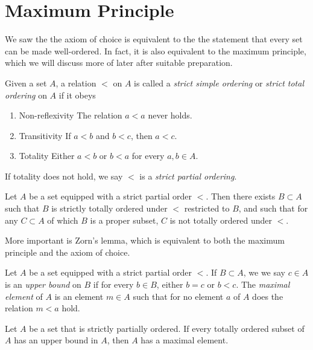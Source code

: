 \section{Maximum Principle}
We saw the the axiom of choice is equivalent to the the statement that
every set can be made well-ordered. In fact, it is also equivalent to the
maximum principle, which we will discuss more of later after suitable
preparation.
\begin{definition}
	Given a set $A$, a relation $<$ on $A$ is called a 
	\emph{strict simple ordering} or \emph{strict total ordering}
	on $A$ if it obeys
	\begin{enumerate}
		\item{Non-reflexivity} The relation $a < a$ never holds.
		\item{Transitivity} If $a < b$ and $b < c$, then $a < c$.
		\item{Totality} Either $a < b$ or $b < a$ for every $a,b \in A$.
	\end{enumerate}
	If totality does not hold, we say $<$ is a \emph{strict partial ordering}.
\end{definition}
\begin{theorem}
	Let $A$ be a set equipped with a strict partial order $<$. Then there exists
	$B \subset A$ such that $B$ is strictly totally ordered under $<$ restricted
	to $B$, and such that for any $C \subset A$ of which $B$ is a proper subset,
	$C$ is not totally ordered under $<$.
\end{theorem}
More important is Zorn's lemma, which is equivalent to both the maximum
principle and the axiom of choice.
\begin{definition}
	\label{def:zorn-def}
	Let $A$ be a set equipped with a strict partial order $<$. If $B \subset A$,
	we we say $c \in A$ is an \emph{upper bound} on $B$ if for every $b \in B$,
	either $b = c$ or $b < c$. The \emph{maximal element} of $A$ is an element
	$m \in A$ such that for no element $a$ of $A$ does the relation $m < a$ hold.
\end{definition}
\begin{theorem}
	Let $A$ be a set that is strictly partially ordered. If every totally ordered
	subset of $A$ has an upper bound in $A$, then $A$ has a maximal element.
\end{theorem}
